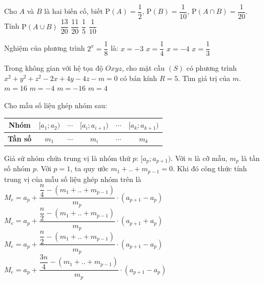 \begin{ex} %
	Cho $A$ và $B$ là hai biến cố, biết $\mathrm{P}(A)=\dfrac{1}{2}$, $\mathrm{P}(B)=\dfrac{1}{10}$, $\mathrm{P}(A\cap B)=\dfrac{1}{20}$. Tính $\mathrm{P}(A\cup B)$
	\choice
	{$\dfrac{13}{20}$}
	{\True $\dfrac{11}{20}$}
	{$\dfrac{1}{5}$}
	{$\dfrac{1}{10}$}
\end{ex}

\begin{ex} %
	Nghiệm của phương trình $2^x=\dfrac{1}{8}$ là:
	\choice
	{\True $x=-3$}
	{$x=\dfrac{1}{4}$}
	{$x=-4$}
	{$x=\dfrac{1}{3}$}
\end{ex}

\begin{ex} %
	Trong không gian với hệ tọa độ $Oxyz$, cho mặt cầu $(S)$ có phương trình $x^2+y^2+z^2-2x+4y-4z-m=0$ có bán kính $R=5$. Tìm giá trị của $m$.
	\choice
	{\True $m=16$}
	{$m=-4$}
	{$m=-16$}
	{$m=4$}
\end{ex}

\begin{ex} %
	Cho mẫu số liệu ghép nhóm sau:
	\begin{center}
		\begin{tabular}{|c|c|c|c|c|c|}
			\hline
			\textbf{Nhóm} & $[a_1;a_2)$ & $\cdots$ & $[a_i;a_{i+1})$ & $\cdots$ & $[a_k;a_{k+1})$ \\
			\hline
			\textbf{Tần số} & $m_1$ & $\cdots$ & $m_i$ & $\cdots$ & $m_k$ \\
			\hline
		\end{tabular}
	\end{center}
	Giả sử nhóm chứa trung vị là nhóm thứ $p$: $[a_p;a_{p+1})$.
	Với $n$ là cỡ mẫu, $m_p$ là tần số nhóm $p$. Với $p=1$, ta quy ước $m_1+..+m_{p-1}=0$.
	Khi đó công thức tính trung vị của mẫu số liệu ghép nhóm trên là
	\choice
	{$M_e=a_p+\dfrac{\dfrac{n}{4}-(m_1+..+m_{p-1})}{m_p}\cdot (a_{p+1}-a_p)$}
	{$M_e=a_p+\dfrac{\dfrac{n}{2}-(m_1+..+m_{p-1})}{m_p}\cdot (a_{p+1}+a_p)$}
	{\True $M_e=a_p+\dfrac{\dfrac{n}{2}-(m_1+..+m_{p-1})}{m_p}\cdot (a_{p+1}-a_p)$}
	{$M_e=a_p+\dfrac{\dfrac{3n}{4}-(m_1+..+m_{p-1})}{m_p}\cdot (a_{p+1}-a_p)$}
\end{ex}

